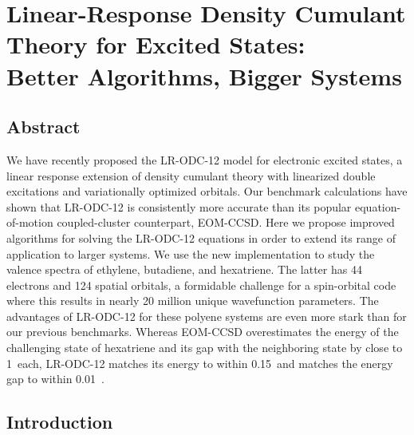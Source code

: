 \chapter[%
    Linear-Response Density Cumulant Theory for Excited States:\\
	Better Algorithms, Bigger Systems
]{%
    Linear-Response Density Cumulant Theory for Excited States:\\
	Better Algorithms, Bigger Systems
}
\label{ch:davidson}


\section{Abstract}

We have recently proposed the LR-ODC-12 model for electronic excited states, a
linear response extension of density cumulant theory with linearized double
excitations and variationally optimized orbitals.
Our benchmark calculations have shown that LR-ODC-12 is consistently more
accurate than its popular equation-of-motion coupled-cluster counterpart,
EOM-CCSD\@.
Here we propose improved algorithms for solving the LR-ODC-12 equations in order
to extend its range of application to larger systems.
We use the new implementation to study the valence spectra of ethylene,
butadiene, and hexatriene.
The latter has 44 electrons and 124 spatial orbitals, a formidable challenge for
a spin-orbital code where this results in nearly 20 million unique wavefunction
parameters.
The advantages of LR-ODC-12 for these polyene systems are even more stark than
for our previous benchmarks.
Whereas EOM-CCSD overestimates the energy of the challenging
 state of hexatriene and its gap with the neighboring
 state by close to 1~\eV each, LR-ODC-12 matches its energy
to within 0.15~\eV and matches the energy gap to within 0.01~\eV.


\section{Introduction}

